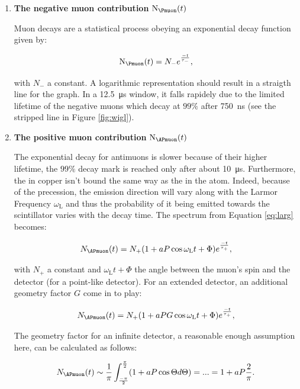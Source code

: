 \begin{enumerate}

\item \textbf{The negative muon contribution} $\text{N}_{\Pmuon}(t)$

Muon decays are a statistical process obeying an exponential decay function given by:

\begin{equation}
\text{N}_{\Pmuon}(t)=N_{-}e^{\frac{-t}{\tau_{-}}},
\end{equation}

with $N_{-}$ a constant. A logarithmic representation should result in a straigth line for the graph. In a \SI{12.5}{\micro\second} window, it falls rapidely due to the limited lifetime of the negative muons which decay at $99\%$ after \SI{750}{\nano\second} (see the stripped line in Figure \ref{fig:wigl}).

\item \textbf{The positive muon contribution} $\text{N}_{\APmuon}(t)$

The exponential decay for antimuons is slower because of their higher lifetime, the $99\%$ decay mark is reached only after about \SI{10}{\micro\second}. Furthermore, the \APmuon in copper isn't bound the same way as the \Pmuon in the atom. Indeed, because of the precession, the emission direction will vary along with the Larmor Frequency $\omega_{\text{L}}$ and thus the probability of it being emitted towards the scintillator varies with the decay time. The spectrum from Equation \ref{eq:larg} becomes:

\begin{equation}
N_{\APmuon}(t)=N_{+}(1+aP\cos{\omega_{\text{L}}t+\Phi})e^{\frac{-t}{\tau_{+}}},
\end{equation}

with $N_{+}$ a constant and $\omega_{\text{L}}t+\Phi$ the angle between the muon's spin and the detector (for a point-like detector). For an extended detector, an additional geometry factor $G$ come in to play:

\begin{equation}
N_{\APmuon}(t)=N_{+}(1+aPG\cos{\omega_{\text{L}}t+\Phi})e^{\frac{-t}{\tau_{+}}},
\end{equation}

The geometry factor for an infinite detector, a reasonable enough assumption here, can be calculated as follows:

\begin{equation}
N_{\APmuon}(t)\sim \frac{1}{\pi} \int_{\frac{-\pi}{2}}^{\frac{\pi}{2}} (1+aP\cos{\Theta}d\Theta)=...=1+aP\frac{2}{\pi}.
\end{equation}


\end{enumerate}
